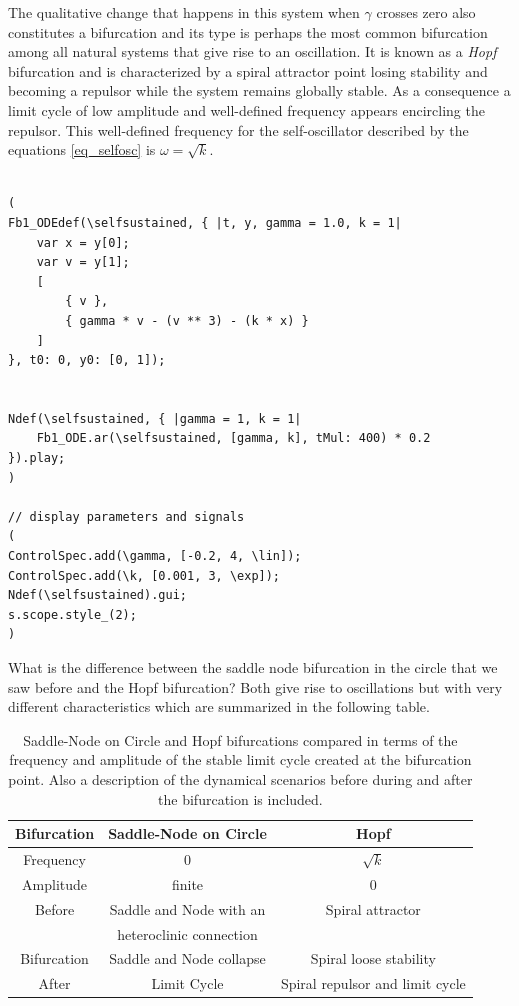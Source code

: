 \documentclass{article}
\begin{document}
The qualitative change that happens in this system when $\gamma$ crosses zero also constitutes a bifurcation and its type is perhaps the most common bifurcation among all natural systems that give rise to an oscillation. 
It is known as a {\em Hopf} bifurcation and is characterized by a spiral attractor point losing stability and becoming a repulsor while the system remains globally stable. As a consequence a limit cycle of low amplitude and well-defined frequency appears encircling the repulsor. This well-defined frequency for the self-oscillator described by the equations \ref{eq_selfosc} is $\omega=\sqrt{k}$.

\begin{lstlisting}[frame=single,caption=Self-sustained oscillation.]

(
Fb1_ODEdef(\selfsustained, { |t, y, gamma = 1.0, k = 1|
	var x = y[0];
	var v = y[1];
	[
		{ v },
		{ gamma * v - (v ** 3) - (k * x) }
	]
}, t0: 0, y0: [0, 1]);


Ndef(\selfsustained, { |gamma = 1, k = 1|
	Fb1_ODE.ar(\selfsustained, [gamma, k], tMul: 400) * 0.2
}).play;
)

// display parameters and signals
(
ControlSpec.add(\gamma, [-0.2, 4, \lin]);
ControlSpec.add(\k, [0.001, 3, \exp]);
Ndef(\selfsustained).gui;
s.scope.style_(2);
)

\end{lstlisting}

\newpage

What is the difference between the saddle node bifurcation in the circle that we saw before and the Hopf bifurcation? 
Both give rise to oscillations but with very different characteristics which are summarized in the following table.

\begin{table}[h!]
\begin{center}
\begin{tabular}{ |c|c|c| }
 \hline
 Bifurcation & Saddle-Node on Circle & Hopf \\ 
 \hline
 \hline
 Frequency & 0 &  $\sqrt{k}$ \\
 \hline
 Amplitude & finite & 0 \\ 
 \hline
 Before & Saddle and Node with an & Spiral attractor \\ 
 & heteroclinic connection & \\
 \hline
 Bifurcation & Saddle and Node collapse & Spiral loose stability \\ 
 \hline
 After & Limit Cycle & Spiral repulsor and limit cycle\\
 \hline
\end{tabular}
\caption{Saddle-Node on Circle and Hopf bifurcations compared in terms of the frequency and amplitude of the stable limit cycle created at the bifurcation point. Also a description of the dynamical scenarios before during and after the bifurcation is included.}
\end{center}
\end{table}
\end{document}
